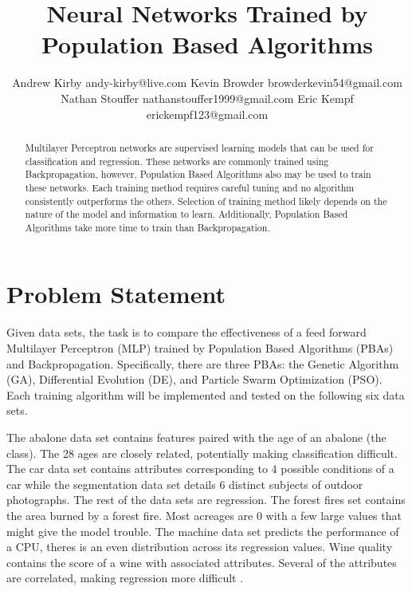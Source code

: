 \documentclass[twoside,11pt]{article}
\begin{document}
\title{Neural Networks Trained by Population Based Algorithms}

\author{\name Andrew Kirby \email andy-kirby@live.com \AND
		\name Kevin Browder \email browderkevin54@gmail.com \AND
		\name Nathan Stouffer \email nathanstouffer1999@gmail.com \AND
		\name Eric Kempf \email erickempf123@gmail.com }

\maketitle

\begin{abstract}
	Multilayer Perceptron networks are supervised learning models that can be used for classification and regression. 
	These networks are commonly trained using Backpropagation, however,
	Population Based Algorithms also may be used to train these networks. 
	Each training method requires careful tuning and no algorithm consistently outperforms the others. 
	Selection of training method likely depends on the nature of the model and information to learn. 
	Additionally, Population Based Algorithms take more time to train than Backpropagation.
\end{abstract}

\section{Problem Statement}

	Given data sets, the task is to compare the effectiveness of a feed forward Multilayer Perceptron (MLP) trained by Population Based Algorithms (PBAs) and Backpropagation. Specifically, there are three PBAs: the Genetic Algorithm (GA), Differential Evolution (DE), and Particle Swarm Optimization (PSO).
	Each training algorithm will be implemented and tested on the following six data sets.

	The abalone data set contains features paired with the age of an abalone (the class). The 28 ages are closely related, potentially making classification difficult.
	The car data set contains attributes corresponding to 4 possible conditions of a car while the segmentation data set details 6 distinct subjects of outdoor photographs.
	The rest of the data sets are regression.
	The forest fires set contains the area burned by a forest fire. Most acreages are 0 with a few large values that might give the model trouble.
	The machine data set predicts the performance of a CPU, theres is an even distribution across its regression values.
	Wine quality contains the score of a wine with associated attributes. Several of the attributes are correlated, making regression more difficult \citep{datasets}.
\end{document}
